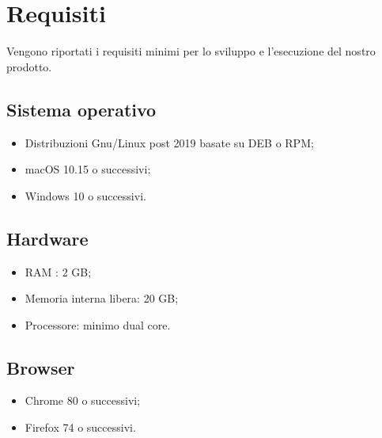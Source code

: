 \section{Requisiti}
Vengono riportati i requisiti minimi per lo sviluppo e l'esecuzione del nostro prodotto.
\subsection{Sistema operativo}
\begin{itemize}
	\item Distribuzioni Gnu/Linux post 2019 basate su DEB o RPM;
	\item macOS 10.15 o successivi;
	\item Windows 10 o successivi.
\end{itemize}

\subsection{Hardware}
\begin{itemize}
	\item RAM : 2 GB;
	\item Memoria interna libera: 20 GB;
	\item Processore: minimo dual core.
\end{itemize}

\subsection{Browser}
\begin{itemize}
	\item Chrome 80 o successivi;
	\item Firefox 74 o successivi.
\end{itemize}

